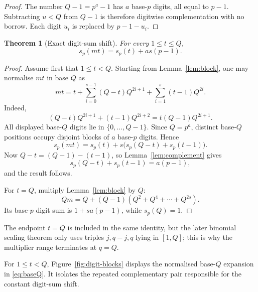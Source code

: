 \documentclass[11pt]{article}
\newtheorem{theorem}{Theorem}[section]
\theoremstyle{definition}
\theoremstyle{remark}
\begin{document}
\begin{proof}
The number \(Q-1=p^a-1\) has \(a\) base-\(p\) digits, all equal to \(p-1\).
Subtracting \(u<Q\) from \(Q-1\) is therefore digitwise complementation with no
borrow.  Each digit \(u_i\) is replaced by \(p-1-u_i\).
\end{proof}

\begin{theorem}[Exact digit-sum shift]\label{thm:digit-shift}
For every \(1\le t\le Q\),
\[
  s_p(mt)=s_p(t)+as(p-1).
\]
\end{theorem}

\begin{proof}
Assume first that \(1\le t<Q\).  Starting from
Lemma~\ref{lem:block}, one may normalise \(mt\) in base \(Q\) as
\begin{equation}\label{eq:baseQ}
  mt
  =
  t
  +\sum_{i=0}^{s-1}(Q-t)Q^{2i+1}
  +\sum_{i=1}^{s}(t-1)Q^{2i}.
\end{equation}
Indeed,
\[
  (Q-t)Q^{2i+1}+(t-1)Q^{2i+2}
  =
  t(Q-1)Q^{2i+1}.
\]
All displayed base-\(Q\) digits lie in \(\{0,\ldots,Q-1\}\).  Since
\(Q=p^a\), distinct base-\(Q\) positions occupy disjoint blocks of \(a\)
base-\(p\) digits.  Hence
\[
  s_p(mt)
  =
  s_p(t)+s\bigl(s_p(Q-t)+s_p(t-1)\bigr).
\]
Now \(Q-t=(Q-1)-(t-1)\), so Lemma~\ref{lem:complement} gives
\[
  s_p(Q-t)+s_p(t-1)=a(p-1),
\]
and the result follows.

For \(t=Q\), multiply Lemma~\ref{lem:block} by \(Q\):
\[
  Qm
  =
  Q+(Q-1)(Q^2+Q^4+\cdots+Q^{2s}).
\]
Its base-\(p\) digit sum is \(1+sa(p-1)\), while \(s_p(Q)=1\).
\end{proof}

The endpoint \(t=Q\) is included in the same identity, but the later binomial
scaling theorem only uses triples \(j,q-j,q\) lying in \([1,Q]\); this is why
the multiplier range terminates at \(q=Q\).

For \(1\le t<Q\), Figure~\ref{fig:digit-blocks} displays the normalised
base-\(Q\) expansion in \eqref{eq:baseQ}.  It isolates the repeated
complementary pair responsible for the constant digit-sum shift.
\end{document}
